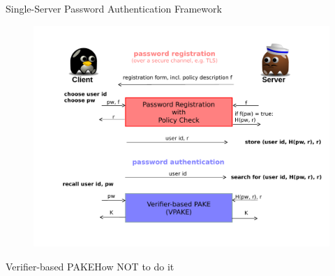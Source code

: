 \documentclass[notes,xcolor=dvipsnames]{beamer}
\begin{document}
\begin{frame}{Single-Server Password Authentication Framework}
  \begin{figure}
  \centering
  \includegraphics[width=\textwidth]{framework1.pdf}
  \end{figure}
\end{frame}

\begin{frame}{Verifier-based PAKE}{How NOT to do it}
  \begin{figure}[thbp]
  \begin{center}
  \end{center}
  \end{figure}
  
  \begin{center}    
  \end{center}
\end{frame}
\end{document}
